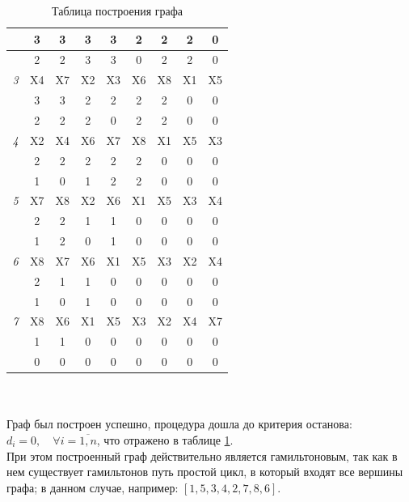 \documentclass{article}
\begin{document}
\begin{enumerate}
\begin{table}[!ht]
\begin{tabular}{|c|c|c|c|c|c|c|c|c|}
        ~ & 3 & 3 & 3 & 3 & \cellcolor{blue!25}2 & 2 & 2 & 0 \\ \hline  
        ~ & 2 & 2 & 3 & 3 & \cellcolor{blue!25}0 & 2 & 2 & 0 \\ \hline  
        \textit{3} & X4 & X7 & X2 & \cellcolor{blue!25}X3 & X6 & X8 & X1 & X5 \\ \hline  
        ~ & 3 & 3 & 2 & \cellcolor{blue!25}2 & 2 & 2 & 0 & 0 \\ \hline  
        ~ & 2 & 2 & 2 & \cellcolor{blue!25}0 & 2 & 2 & 0 & 0 \\ \hline  
        \textit{4} & X2 & \cellcolor{blue!25}X4 & X6 & X7 & X8 & X1 & X5 & X3 \\ \hline  
        ~ & 2 & \cellcolor{blue!25}2 & 2 & 2 & 2 & 0 & 0 & 0 \\ \hline  
        ~ & 1 & \cellcolor{blue!25}0 & 1 & 2 & 2 & 0 & 0 & 0 \\ \hline  
        \textit{5} & X7 & X8 & \cellcolor{blue!25}X2 & X6 & X1 & X5 & X3 & X4 \\ \hline  
        ~ & 2 & 2 & \cellcolor{blue!25}1 & 1 & 0 & 0 & 0 & 0 \\ \hline  
        ~ & 1 & 2 & \cellcolor{blue!25}0 & 1 & 0 & 0 & 0 & 0 \\ \hline  
        \textit{6} & X8 & \cellcolor{blue!25}X7 & X6 & X1 & X5 & X3 & X2 & X4 \\ \hline  
        ~ & 2 & \cellcolor{blue!25}1 & 1 & 0 & 0 & 0 & 0 & 0 \\ \hline  
        ~ & 1 & \cellcolor{blue!25}0 & 1 & 0 & 0 & 0 & 0 & 0 \\ \hline  
        \textit{7} & \cellcolor{blue!25}X8 & X6 & X1 & X5 & X3 & X2 & X4 & X7 \\ \hline  
        ~ & \cellcolor{blue!25}1 & 1 & 0 & 0 & 0 & 0 & 0 & 0 \\ \hline  
        ~ & \cellcolor{blue!25}0 & 0 & 0 & 0 & 0 & 0 & 0 & 0 \\ \hline 
    \end{tabular}
    \caption{Таблица построения графа}
    \label{tab:3_table}
\end{table}
\\
\\
Граф был построен успешно, процедура дошла до критерия останова: $d_i = 0,\quad \forall i = \overline{1,n}$, что отражено в таблице \ref{tab:3_table}.
\\
При этом построенный граф действительно является гамильтоновым, так как в нем существует гамильтонов путь \quad\textemdash\quad простой цикл, в который входят все вершины графа; в данном случае, например:
 $[1,5,3,4,2,7,8,6]$.
\end{enumerate}
\end{document}
